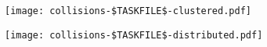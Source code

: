 \documentclass[11pt,a4paper]{article}
\begin{document}
\noindent
\begin{minipage}{0.5\textwidth}
\texttt{[image: collisions-\$TASKFILE\$-clustered.pdf]}
\end{minipage}
\begin{minipage}{0.5\textwidth}
\texttt{[image: collisions-\$TASKFILE\$-distributed.pdf]}
\end{minipage}
\\[0.5cm]

%
%
%
\end{document}
